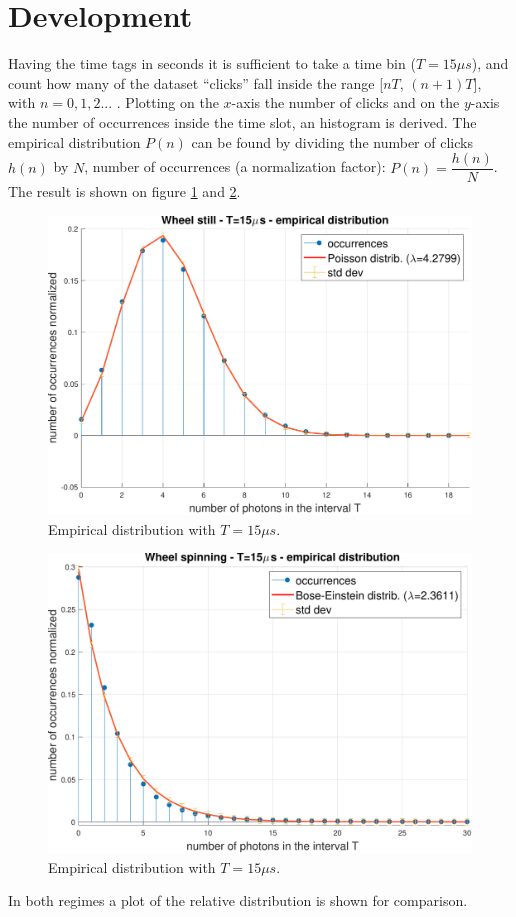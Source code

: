 
\section{Development}
Having the time tags in seconds it is sufficient to take a time bin ($T=15\mu s$), and count how many of the dataset ``clicks'' fall inside the range [$nT$, $(n+1)T$], with $n=0,1,2...$ . Plotting on the $x$-axis the number of clicks and on the $y$-axis the number of occurrences inside the time slot, an histogram is derived. The empirical distribution $P(n)$ can be found by dividing the number of clicks $h(n)$ by $N$, number of occurrences (a normalization factor): $P(n)=\dfrac{h(n)}{N}$. The result is shown on figure \ref{fig:still} and \ref{fig:spinning}.
\begin{figure}[H]
    \centering
    \includegraphics[width=.9\textwidth]{images/Still_Wheel.pdf}
    \caption{Empirical distribution with $T=15\mu s$.}
    \label{fig:still}    
\end{figure}
\begin{figure}[H]
    \centering
    \includegraphics[width=.9\textwidth]{images/Spinning_Wheel.pdf}
    \caption{Empirical distribution with $T=15\mu s$.}
    \label{fig:spinning}    
\end{figure}
In both regimes a plot of the relative distribution is shown for comparison. \\

